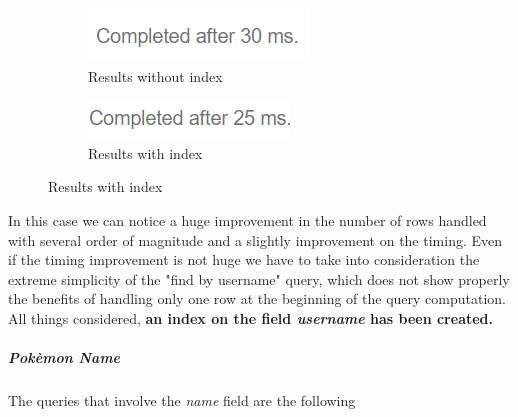\begin{figure}[H]
\begin{subfigure}{0.5\textwidth}
	\end{subfigure}
\end{figure}
\begin{figure}[H]
	\begin{subfigure}{0.5\textwidth}
		\includegraphics[width=0.9\linewidth]{img/user_without_index_2.png} 
		\caption{Results without index}
	\end{subfigure}
	\begin{subfigure}{0.5\textwidth}
		\includegraphics[width=0.9\linewidth]{img/user_with_index_2.png}
		\caption{Results with index}
	\end{subfigure}
\end{figure}

In this case we can notice a huge improvement in the number of rows handled with several order of magnitude and a slightly improvement on the timing. Even if the timing improvement is not huge we have to take into consideration the extreme simplicity of the "find by username" query, which does not show properly the benefits of handling only one row at the beginning of the query computation. All things considered, \textbf{an index on the field \textit{username} has been created.}

\subparagraph{Pokèmon Name}
The queries that involve the \textit{name} field are the following

